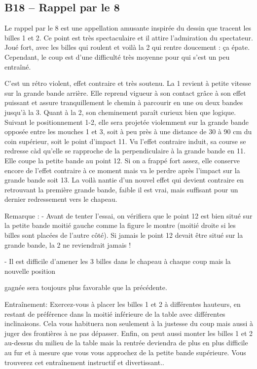 \subsection{B18 -- Rappel par le 8}\label{b18-rappel-par-le-8}

Le rappel par le 8 est une appellation amusante inspirée du dessin que
tracent les billes 1 et 2. Ce point est très spectaculaire et il attire
l'admiration du spectateur. Joué fort, avec les billes qui roulent et
voilà la 2 qui rentre doucement : ça épate. Cependant, le coup est d'une
difficulté très moyenne pour qui s'est un peu entraîné.

C'est un rétro violent, effet contraire et très soutenu. La 1 revient à
petite vitesse sur la grande bande arrière. Elle reprend vigueur à son
contact grâce à son effet puissant et assure tranquillement le chemin à
parcourir en une ou deux bandes jusqu'à la 3. Quant à la 2, son
cheminement paraît curieux bien que logique. Suivant le positionnement
1-2, elle sera projetée violemment sur la grande bande opposée entre les
mouches 1 et 3, soit à peu près à une distance de 30 à 90 cm du coin
supérieur, soit le point d'impact 11. Vu l'effet contraire induit, sa
course se redresse càd qu'elle se rapproche de la perpendiculaire à la
grande bande en 11. Elle coupe la petite bande au point 12. Si on a
frappé fort assez, elle conserve encore de l'effet contraire à ce moment
mais va le perdre après l'impact sur la grande bande soit 13. La voilà
nantie d'un nouvel effet qui devient contraire en retrouvant la première
grande bande, faible il est vrai, mais suffisant pour un dernier
redressement vers le chapeau.

Remarque : - Avant de tenter l'essai, on vérifiera que le point 12 est
bien situé sur la petite bande moitié gauche comme la figure le montre
(moitié droite si les billes sont placées de l'autre côté). Si jamais le
point 12 devait être situé sur la grande bande, la 2 ne reviendrait
jamais !

- Il est difficile d'amener les 3 billes dans le chapeau à chaque coup
mais la nouvelle position

gagnée sera toujours plus favorable que la précédente.

Entraînement: Exercez-vous à placer les billes 1 et 2 à différentes
hauteurs, en restant de préférence dans la moitié inférieure de la table
avec différentes inclinaisons. Cela vous habituera non seulement à la
justesse du coup mais aussi à juger des frontières à ne pas dépasser.
Enfin, on peut aussi monter les billes 1 et 2 au-dessus du milieu de la
table mais la rentrée deviendra de plus en plus difficile au fur et à
mesure que vous vous approchez de la petite bande supérieure. Vous
trouverez cet entraînement instructif et divertissant..

